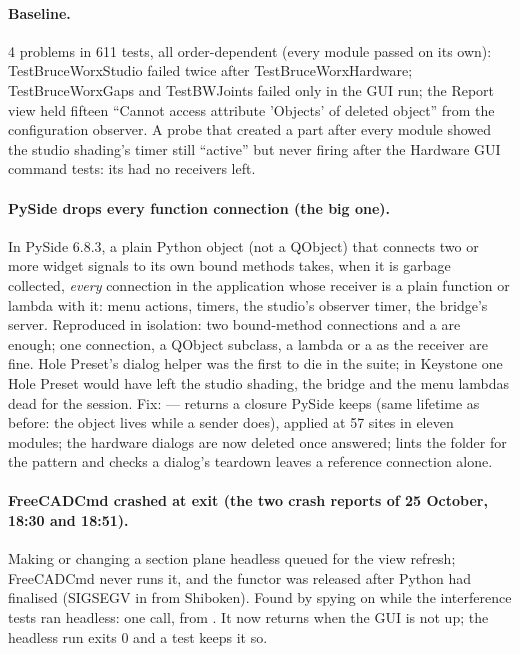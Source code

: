 \paragraph{Baseline.} 4 problems in 611 tests, all order-dependent (every module passed on its own):
TestBruceWorxStudio failed twice after TestBruceWorxHardware; TestBruceWorxGaps and TestBWJoints failed only
in the GUI run; the Report view held fifteen ``Cannot access attribute 'Objects' of deleted object'' from the
configuration observer. A probe that created a part after every module showed the studio shading's timer still
``active'' but never firing after the Hardware GUI command tests: its  had no receivers left.

\paragraph{PySide drops every function connection (the big one).} In PySide 6.8.3, a plain Python object (not a
QObject) that connects two or more widget signals to its own bound methods takes, when it is garbage collected,
\emph{every} connection in the application whose receiver is a plain function or lambda with it: menu actions,
timers, the studio's observer timer, the bridge's server. Reproduced in isolation: two bound-method connections
and a  are enough; one connection, a QObject subclass, a lambda or a  as the
receiver are fine. Hole Preset's dialog helper was the first to die in the suite; in Keystone one Hole Preset would
have left the studio shading, the bridge and the menu lambdas dead for the session. Fix:
 ---  returns a closure PySide keeps (same lifetime as before:
the object lives while a sender does), applied at 57 sites in eleven modules; the hardware dialogs are now
deleted once answered;  lints the folder for the pattern and 
checks a dialog's teardown leaves a reference connection alone.

\paragraph{FreeCADCmd crashed at exit (the two crash reports of 25 October, 18:30 and 18:51).} Making or changing a
section plane headless queued  for the view refresh; FreeCADCmd never runs it, and the
functor was released after Python had finalised (SIGSEGV in  from Shiboken). Found by
spying on  while the interference tests ran headless: one call, from
. It now returns when the GUI is not up; the headless run exits 0 and a test
keeps it so.

